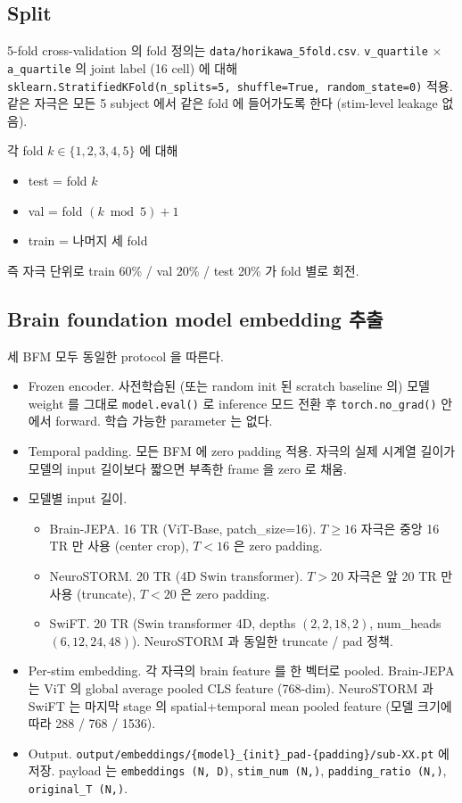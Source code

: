 \documentclass[a4paper,11pt]{article}
\begin{document}
\subsection{Split}

5-fold cross-validation 의 fold 정의는 \texttt{data/horikawa\_5fold.csv}.
\texttt{v\_quartile} $\times$ \texttt{a\_quartile} 의 joint label (16 cell) 에 대해
\texttt{sklearn.StratifiedKFold(n\_splits=5, shuffle=True, random\_state=0)} 적용.
같은 자극은 모든 5 subject 에서 같은 fold 에 들어가도록 한다 (stim-level leakage 없음).

각 fold $k\in\{1,2,3,4,5\}$ 에 대해
\begin{itemize}[leftmargin=*, itemsep=2pt]
  \item test = fold $k$
  \item val = fold $(k \bmod 5) + 1$
  \item train = 나머지 세 fold
\end{itemize}
즉 자극 단위로 train 60\% / val 20\% / test 20\% 가 fold 별로 회전.

\subsection{Brain foundation model embedding 추출}

세 BFM 모두 동일한 protocol 을 따른다.

\begin{itemize}[leftmargin=*, itemsep=2pt]
  \item Frozen encoder. 사전학습된 (또는 random init 된 scratch baseline 의) 모델 weight 를 그대로
    \texttt{model.eval()} 로 inference 모드 전환 후 \texttt{torch.no\_grad()} 안에서 forward.
    학습 가능한 parameter 는 없다.
  \item Temporal padding. 모든 BFM 에 zero padding 적용. 자극의 실제 시계열 길이가 모델의
    input 길이보다 짧으면 부족한 frame 을 zero 로 채움.
  \item 모델별 input 길이.
    \begin{itemize}
      \item Brain-JEPA. 16 TR (ViT-Base, patch\_size=16). $T \geq 16$ 자극은 중앙 16 TR 만 사용 (center crop), $T < 16$ 은 zero padding.
      \item NeuroSTORM. 20 TR (4D Swin transformer). $T > 20$ 자극은 앞 20 TR 만 사용 (truncate), $T < 20$ 은 zero padding.
      \item SwiFT. 20 TR (Swin transformer 4D, depths $(2,2,18,2)$, num\_heads $(6,12,24,48)$). NeuroSTORM 과 동일한 truncate / pad 정책.
    \end{itemize}
  \item Per-stim embedding. 각 자극의 brain feature 를 한 벡터로 pooled.
    Brain-JEPA 는 ViT 의 global average pooled CLS feature (768-dim).
    NeuroSTORM 과 SwiFT 는 마지막 stage 의 spatial+temporal mean pooled feature (모델 크기에 따라 288 / 768 / 1536).
  \item Output. \texttt{output/embeddings/\{model\}\_\{init\}\_pad-\{padding\}/sub-XX.pt} 에 저장.
    payload 는 \texttt{embeddings (N, D)}, \texttt{stim\_num (N,)}, \texttt{padding\_ratio (N,)}, \texttt{original\_T (N,)}.
\end{itemize}
\end{document}
